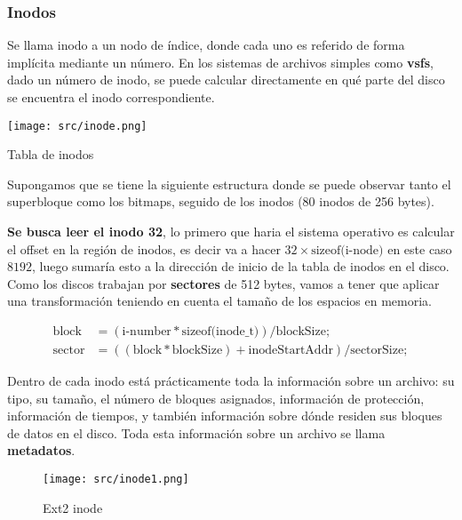 \documentclass[openany]{book}
\begin{document}
\subsubsection{Inodos}

Se llama inodo a un \colorbox{green!20}{nodo de índice}, donde cada uno es referido de forma implícita mediante un número. En los sistemas de archivos simples como \textbf{vsfs}, dado un número de inodo, se puede calcular directamente en qué parte del disco se encuentra el inodo correspondiente.

\begin{floatingfigure}[r]{0.6\textwidth}
    \texttt{[image: src/inode.png]}
    \caption{Tabla de inodos}
\end{floatingfigure}

Supongamos que se tiene la siguiente estructura donde se puede observar tanto el superbloque como los bitmaps, seguido de los inodos (80 inodos de 256 bytes). 

\textbf{Se busca leer el inodo 32}, lo primero que haria el sistema operativo es calcular el \colorbox{green!20}{offset} en la región de inodos, es decir va a hacer $32 \times \text{sizeof(i-node)}$ en este caso $8192$, luego sumaría esto a la \colorbox{green!20}{dirección de inicio} de la tabla de inodos en el disco. Como los discos trabajan por \textbf{sectores} de 512 bytes, vamos a tener que aplicar una transformación teniendo en cuenta el tamaño de los espacios en memoria.

\begin{align*}
    \text{block} &= (\text{i-number} * \text{sizeof(inode\_t)}) / \text{blockSize}; \\
    \text{sector} &=  ((\text{block} * \text{blockSize}) + \text{inodeStartAddr}) / \text{sectorSize};
\end{align*}

\newpage
Dentro de cada inodo está prácticamente toda la información sobre un archivo: su \colorbox{green!20}{tipo}, su \colorbox{green!20}{tamaño}, el \colorbox{green!20}{número} de bloques asignados, información de \colorbox{green!20}{protección},  información de \colorbox{green!20}{tiempos},  y también información sobre dónde residen sus \colorbox{green!20}{bloques de datos} en el disco. Toda esta información sobre un archivo se llama \textbf{metadatos}.

\begin{figure}[h]
    \centering
    \texttt{[image: src/inode1.png]}
    \caption{Ext2 inode}
\end{figure}
\end{document}

